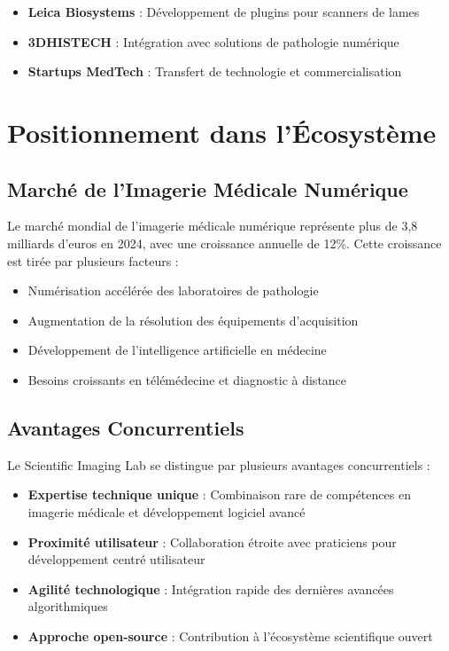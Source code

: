 \documentclass[12pt,a4paper]{report}
\begin{document}
\begin{itemize}
\item \textbf{Leica Biosystems} : Développement de plugins pour scanners de lames
\item \textbf{3DHISTECH} : Intégration avec solutions de pathologie numérique
\item \textbf{Startups MedTech} : Transfert de technologie et commercialisation
\end{itemize}

\section{Positionnement dans l'Écosystème}

\subsection{Marché de l'Imagerie Médicale Numérique}

Le marché mondial de l'imagerie médicale numérique représente plus de 3,8 milliards d'euros en 2024, avec une croissance annuelle de 12\%. Cette croissance est tirée par plusieurs facteurs :

\begin{itemize}
\item Numérisation accélérée des laboratoires de pathologie
\item Augmentation de la résolution des équipements d'acquisition
\item Développement de l'intelligence artificielle en médecine
\item Besoins croissants en télémédecine et diagnostic à distance
\end{itemize}

\subsection{Avantages Concurrentiels}

Le Scientific Imaging Lab se distingue par plusieurs avantages concurrentiels :

\begin{itemize}
\item \textbf{Expertise technique unique} : Combinaison rare de compétences en imagerie médicale et développement logiciel avancé
\item \textbf{Proximité utilisateur} : Collaboration étroite avec praticiens pour développement centré utilisateur
\item \textbf{Agilité technologique} : Intégration rapide des dernières avancées algorithmiques
\item \textbf{Approche open-source} : Contribution à l'écosystème scientifique ouvert
\end{itemize}
\end{document}
